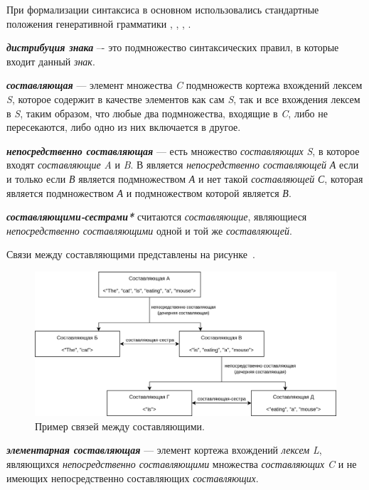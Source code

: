 При формализации синтаксиса в основном использовались стандартные положения генеративной грамматики , , , .

\textbf{\textit{дистрибуция знака}} –- это подмножество синтаксических правил, в которые входит данный \textit{знак}.

\textbf{\textit{составляющая}} --- элемент множества \textit{C} подмножеств кортежа вхождений лексем \textit{S}, которое содержит в качестве элементов как сам \textit{S}, так и все вхождения лексем в \textit{S}, таким образом, что любые два подмножества, входящие в \textit{C}, либо не пересекаются, либо одно из них включается в другое.

\textbf{\textit{непосредственно составляющая}} ---  есть множество \textit{составляющих} \textit{S}, в которое входят \textit{составляющие} \textit{A} и \textit{B}. В является \textit{непосредственно составляющей} \textit{А} если и только если \textit{В} является подмножеством \textit{А} и нет такой \textit{составляющей} \textit{С}, которая является подмножеством \textit{А} и подмножеством которой является \textit{В}.

\textbf{\textit{составляющими-сестрами*}} считаются \textit{составляющие}, являющиеся \textit{непосредственно составляющими} одной и той же \textit{составляющей}.

Связи между составляющими представлены на рисунке~\textit{}.

\begin{figure}[h]
    \centering
    \includegraphics[scale=0.25]{images/part2/chapter_lang/syntactic_example}
    \caption{Пример связей между составляющими.}
    \label{fig:syntactic_example}
\end{figure}

\textbf{\textit{элементарная составляющая}} --- элемент кортежа вхождений \textit{лексем} \textit{L}, являющихся \textit{непосредственно составляющими} множества \textit{составляющих} \textit{C} и не имеющих непосредственно составляющих \textit{составляющих}.

